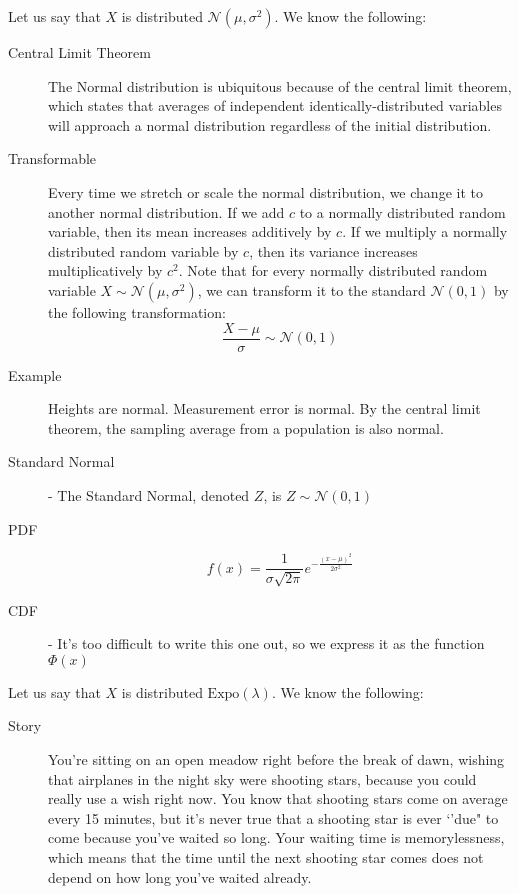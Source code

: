 \documentclass[10pt,landscape]{article}
\theoremstyle{definition}
\newcommand{\N}{\mathcal{N}}
\newcommand{\Expo}{\textrm{Expo}}
\begin{document}
\begin{multicols}{3}
\begin{description}
\begin{description}
    
\end{description}

\item[Normal] Let us say that $X$ is distributed $\N(\mu, \sigma^2)$. We know the following:
\begin{description}
    \item[Central Limit Theorem] The Normal distribution is ubiquitous because of the central limit theorem, which states that averages of independent identically-distributed variables will approach a normal distribution regardless of the initial distribution.
    \item[Transformable] Every time we stretch or scale the normal distribution, we change it to another normal distribution. If we add $c$ to a normally distributed random variable, then its mean increases additively by $c$. If we multiply a normally distributed random variable by $c$, then its variance increases multiplicatively by $c^2$. Note that for every normally distributed random variable $X \sim \N(\mu, \sigma^2)$, we can transform it to the standard $\N(0, 1)$ by the following transformation:
    \[\frac{X - \mu}{\sigma} \sim \N(0, 1) \]
    \item[Example] Heights are normal. Measurement error is normal. By the central limit theorem, the sampling average from a population is also normal.
    \item[Standard Normal] - The Standard Normal, denoted $Z$, is $Z \sim \N(0, 1)$
    \item[PDF]
\[ f(x)=\frac{1}{\sigma \sqrt{2\pi}} e^{-\frac{(x - \mu)^2}{2 \sigma^2}} \]
    \item[CDF] - It's too difficult to write this one out, so we express it as the function $\Phi(x)$
\end{description}


\item[Exponential Distribution]
\begin{description}
\item Let us say that $X$ is distributed $\Expo(\lambda)$. We know the following:
\begin{description}
    \item[Story] You're sitting on an open meadow right before the break of dawn, wishing that airplanes in the night sky were shooting stars, because you could really use a wish right now. You know that shooting stars come on average every 15 minutes, but it's never true that a shooting star is ever `'due" to come because you've waited so long. Your waiting time is memorylessness, which means that the time until the next shooting star comes does not depend on how long you've waited already.
    

\end{description}
\end{description}
\end{description}
\end{multicols}
\end{document}
